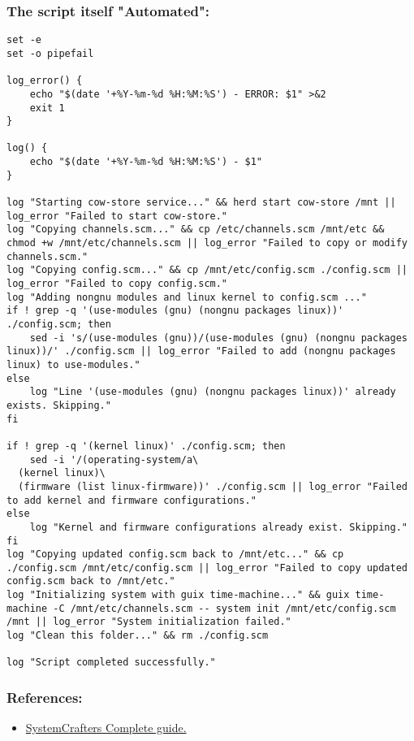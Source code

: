 \documentclass[11pt]{article}
\begin{document}
\subsubsection{The script itself "Automated":}
\label{sec:org319ed73}

\begin{verbatim}
set -e
set -o pipefail

log_error() {
    echo "$(date '+%Y-%m-%d %H:%M:%S') - ERROR: $1" >&2
    exit 1
}

log() {
    echo "$(date '+%Y-%m-%d %H:%M:%S') - $1"
}

log "Starting cow-store service..." && herd start cow-store /mnt || log_error "Failed to start cow-store."
log "Copying channels.scm..." && cp /etc/channels.scm /mnt/etc && chmod +w /mnt/etc/channels.scm || log_error "Failed to copy or modify channels.scm."
log "Copying config.scm..." && cp /mnt/etc/config.scm ./config.scm || log_error "Failed to copy config.scm."
log "Adding nongnu modules and linux kernel to config.scm ..."
if ! grep -q '(use-modules (gnu) (nongnu packages linux))' ./config.scm; then
    sed -i 's/(use-modules (gnu))/(use-modules (gnu) (nongnu packages linux))/' ./config.scm || log_error "Failed to add (nongnu packages linux) to use-modules."
else
    log "Line '(use-modules (gnu) (nongnu packages linux))' already exists. Skipping."
fi

if ! grep -q '(kernel linux)' ./config.scm; then
    sed -i '/(operating-system/a\
  (kernel linux)\
  (firmware (list linux-firmware))' ./config.scm || log_error "Failed to add kernel and firmware configurations."
else
    log "Kernel and firmware configurations already exist. Skipping."
fi
log "Copying updated config.scm back to /mnt/etc..." && cp ./config.scm /mnt/etc/config.scm || log_error "Failed to copy updated config.scm back to /mnt/etc."
log "Initializing system with guix time-machine..." && guix time-machine -C /mnt/etc/channels.scm -- system init /mnt/etc/config.scm /mnt || log_error "System initialization failed."
log "Clean this folder..." && rm ./config.scm 

log "Script completed successfully."
\end{verbatim}
\subsubsection{References:}
\label{sec:orgf43080a}
\begin{itemize}
\item \href{https://systemcrafters.net/craft-your-system-with-guix/full-system-install/}{SystemCrafters Complete guide.}
\end{itemize}
\end{document}
